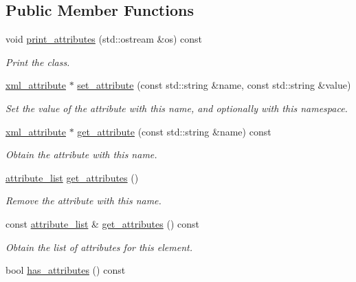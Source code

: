 \subsection*{Public Member Functions}
\begin{DoxyCompactItemize}
\item 
void \hyperlink{structattribute__sequence_a451d11624a55b8ea204e640013408538}{print\+\_\+attributes} (std\+::ostream \&os) const
\begin{DoxyCompactList}\small\item\em Print the class. \end{DoxyCompactList}\item 
\hyperlink{classxml__attribute}{xml\+\_\+attribute} $\ast$ \hyperlink{structattribute__sequence_a980d8d0966c1af614141536566d9ed62}{set\+\_\+attribute} (const std\+::string \&name, const std\+::string \&value)
\begin{DoxyCompactList}\small\item\em Set the value of the attribute with this name, and optionally with this namespace. \end{DoxyCompactList}\item 
\hyperlink{classxml__attribute}{xml\+\_\+attribute} $\ast$ \hyperlink{structattribute__sequence_a0d88042550f00dd0bbbb5163f9407e9c}{get\+\_\+attribute} (const std\+::string \&name) const
\begin{DoxyCompactList}\small\item\em Obtain the attribute with this name. \end{DoxyCompactList}\item 
\hyperlink{structattribute__sequence_ac9a1c1462a6334a140de3925dbeaae96}{attribute\+\_\+list} \hyperlink{structattribute__sequence_a4d995fdfcb7e65006b615e8c1dd4f96b}{get\+\_\+attributes} ()
\begin{DoxyCompactList}\small\item\em Remove the attribute with this name. \end{DoxyCompactList}\item 
const \hyperlink{structattribute__sequence_ac9a1c1462a6334a140de3925dbeaae96}{attribute\+\_\+list} \& \hyperlink{structattribute__sequence_a1ac607e291e7717872691d5d25a6b956}{get\+\_\+attributes} () const
\begin{DoxyCompactList}\small\item\em Obtain the list of attributes for this element. \end{DoxyCompactList}\item 
bool \hyperlink{structattribute__sequence_a48b6174d3fe05633e44b9ae9d37138a4}{has\+\_\+attributes} () const
\end{DoxyCompactItemize}
